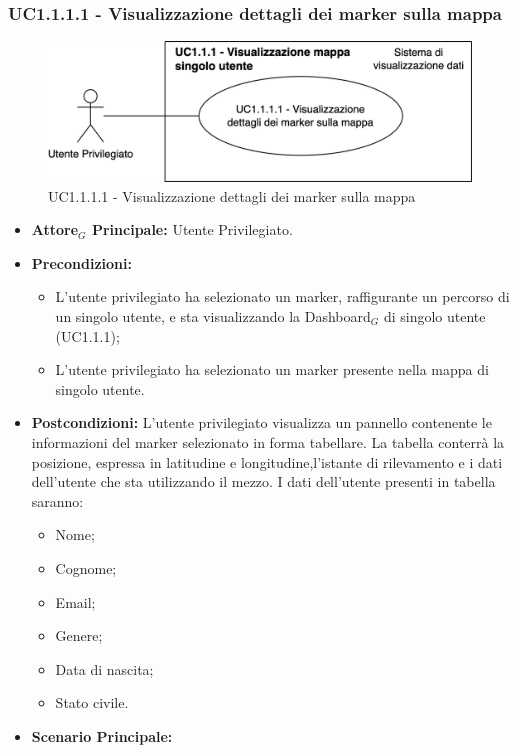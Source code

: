 \documentclass[11pt]{article}
\begin{document}
\begin{justify}
\subsubsection{\textbf{UC1.1.1.1 - Visualizzazione dettagli dei marker sulla mappa}}
\begin{figure}[H]
    \centering
    \includegraphics[width=0.7\linewidth]{UC1.1.1.1image.png}
    \caption{UC1.1.1.1 - Visualizzazione dettagli dei marker sulla mappa}
    \label{fig:UC1.1.1.1}
\end{figure}
\label{UC1.1.1.1}
\begin{itemize}
     \item \textbf{Attore$_G$ Principale:} Utente Privilegiato.
     \item \textbf{Precondizioni:}
        \begin{itemize}
        \item L'utente privilegiato ha selezionato un marker, raffigurante un percorso di un singolo utente, e sta visualizzando la Dashboard$_G$ di singolo utente (UC1.1.1);
          \item L'utente privilegiato ha selezionato un marker presente nella mappa di singolo utente.
        \end{itemize}
      \item \textbf{Postcondizioni:} L'utente privilegiato visualizza un pannello contenente le informazioni del marker selezionato in forma tabellare. La tabella conterrà la posizione, espressa in latitudine e longitudine,l'istante di rilevamento e i dati dell'utente che sta utilizzando il mezzo. I dati dell'utente presenti in tabella saranno:
        \begin{itemize}
        \item Nome;
        \item Cognome;
        \item Email;
        \item Genere;
        \item Data di nascita;
        \item Stato civile.
        \end{itemize}
      \item \textbf{Scenario Principale:}

\end{itemize}
\end{justify}
\end{document}
